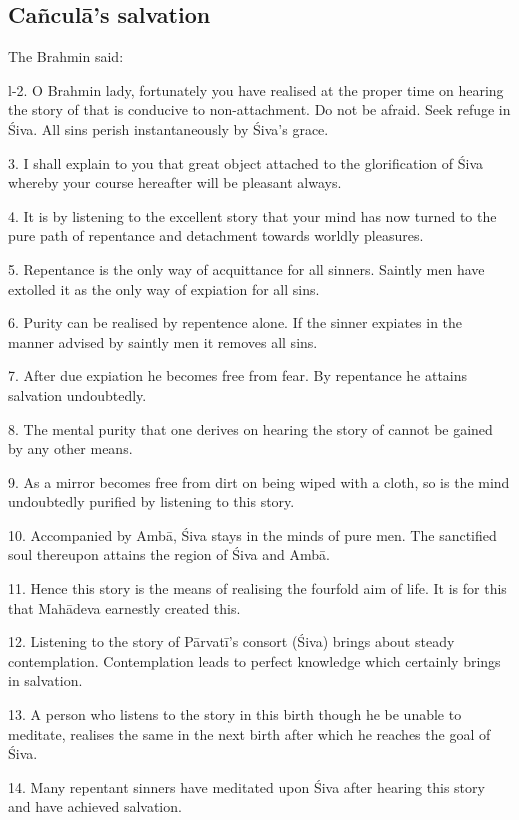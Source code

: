 {}
\subsection*{Cañculā’s salvation}

The Brahmin said:

l-2. O Brahmin lady, fortunately you have realised at the proper time on hearing
the story of  that is conducive to non-attachment. Do not be
afraid. Seek refuge in Śiva. All sins perish instantaneously by Śiva’s grace.

3. I shall explain to you that great object attached to the glorification of
Śiva whereby your course hereafter will be pleasant always.

4. It is by listening to the excellent story that your mind has now turned to
the pure path of repentance and detachment towards worldly pleasures.

5. Repentance is the only way of acquittance for all sinners. Saintly men have
extolled it as the only way of expiation for all sins.

6. Purity can be realised by repentence alone. If the sinner expiates in the
manner advised by saintly men it removes all sins.

7. After due expiation he becomes free from fear. By repentance he attains
salvation undoubtedly.

8. The mental purity that one derives on hearing the story of 
cannot be gained by any other means.

9. As a mirror becomes free from dirt on being wiped with a cloth, so is the
mind undoubtedly purified by listening to this story.

10. Accompanied by Ambā, Śiva stays in the minds of pure men. The sanctified
soul thereupon attains the region of Śiva and Ambā.

11. Hence this story is the means of realising the fourfold aim of life. It is
for this that Mahādeva earnestly created this.

12. Listening to the story of Pārvatī’s consort (Śiva) brings about steady
contemplation. Contemplation leads to perfect knowledge which certainly brings
in salvation.

13. A person who listens to the story in this birth though he be unable to
meditate, realises the same in the next birth after which he reaches the goal
of Śiva.

14. Many repentant sinners have meditated upon Śiva after hearing this story and
have achieved salvation.

